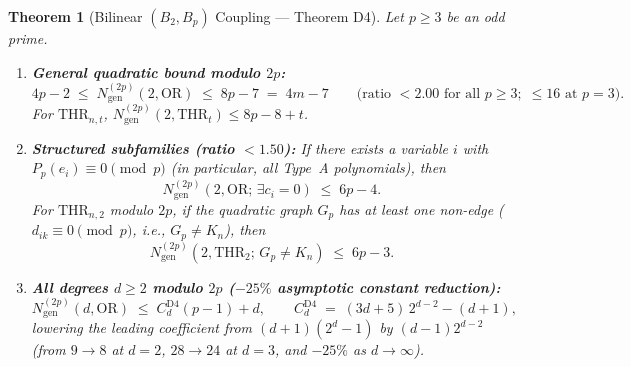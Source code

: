 \documentclass[11pt,a4paper]{article}
\newtheorem{theorem}{Theorem}[section]
\theoremstyle{definition}
\newcommand{\OR}{\mathrm{OR}}
\newcommand{\THR}{\mathrm{THR}}
\newcommand{\Ngen}{N_{\mathrm{gen}}}
\begin{document}
\begin{theorem}[Bilinear $(B_2, B_p)$ Coupling --- Theorem D4]
\label{thm:d4}
Let $p \ge 3$ be an odd prime.
\begin{enumerate}[leftmargin=*,nosep]
  \item \textbf{General quadratic bound modulo $2p$:}
  \[
    4p - 2 \;\le\; \Ngen^{(2p)}(2, \OR) \;\le\; 8p - 7 \;=\; 4m - 7
    \qquad \bigl(\text{ratio } < 2.00\text{ for all } p \ge 3;\; \le 16 \text{ at } p=3\bigr).
  \]
  For $\THR_{n,t}$, $\Ngen^{(2p)}(2, \THR_t) \le 8p - 8 + t$.
  \item \textbf{Structured subfamilies (ratio $< 1.50$):} If there exists a variable $i$ with $P_p(e_i) \equiv 0 \pmod p$ (in particular, all Type~A polynomials), then
  \[
    \Ngen^{(2p)}(2, \OR;\, \exists c_i = 0) \;\le\; 6p - 4.
  \]
  For $\THR_{n,2}$ modulo $2p$, if the quadratic graph $G_p$ has at least one non-edge ($d_{ik} \equiv 0 \pmod p$, i.e., $G_p \neq K_n$), then
  \[
    \Ngen^{(2p)}(2, \THR_2;\, G_p \neq K_n) \;\le\; 6p - 3.
  \]
  \item \textbf{All degrees $d \ge 2$ modulo $2p$ ($-25\%$ asymptotic constant reduction):}
  \[
    \Ngen^{(2p)}(d, \OR) \;\le\; C_d^{\mathrm{D4}}(p - 1) + d,
    \qquad C_d^{\mathrm{D4}} \;=\; (3d + 5)\, 2^{d-2} - (d + 1),
  \]
  lowering the leading coefficient from $(d+1)(2^d - 1)$ by $(d-1)2^{d-2}$ (from $9 \to 8$ at $d=2$, $28 \to 24$ at $d=3$, and $-25\%$ as $d \to \infty$).
\end{enumerate}
\end{theorem}
\end{document}
